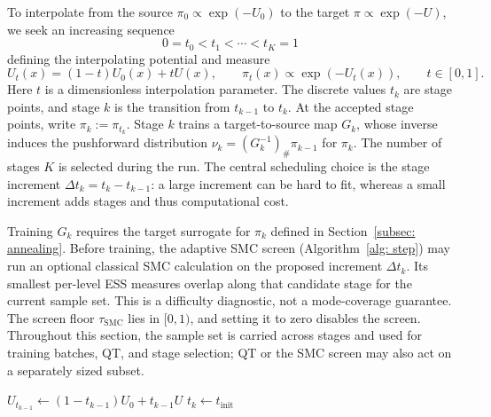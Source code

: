 \documentclass{article}
\begin{document}
To interpolate from the source $\pi_0 \propto \exp(-U_0)$ to the target $\pi \propto \exp(-U)$, we seek an increasing sequence
\begin{equation*}
    0 = t_0 < t_1 < \cdots < t_K = 1
\end{equation*}
defining the interpolating potential and measure
\begin{equation*}
    U_t(x)=(1-t)U_0(x)+tU(x),
\qquad \pi_t(x)\propto\exp(-U_t(x)),
    \qquad t\in[0,1].
\end{equation*}
Here $t$ is a dimensionless interpolation parameter. The discrete values $t_k$ are stage points, and stage $k$ is the transition from $t_{k-1}$ to $t_k$. At the accepted stage points, write $\pi_k:=\pi_{t_k}$. Stage $k$ trains a target-to-source map $G_k$, whose inverse induces the pushforward distribution $\nu_k=(G_k^{-1})_{\#}\pi_{k-1}$ for $\pi_k$. The number of stages $K$ is selected during the run. The central scheduling choice is the stage increment $\Delta t_k=t_k-t_{k-1}$: a large increment can be hard to fit, whereas a small increment adds stages and thus computational cost.

Training $G_k$ requires the target surrogate for $\pi_k$ defined in Section~\ref{subsec: annealing}. Before training, the adaptive SMC screen (Algorithm~\ref{alg: step}) may run an optional classical SMC calculation on the proposed increment $\Delta t_k$. Its smallest per-level ESS measures overlap along that candidate stage for the current sample set. This is a difficulty diagnostic, not a mode-coverage guarantee. The screen floor $\tau_{\mathrm{SMC}}$ lies in $[0,1)$, and setting it to zero disables the screen. Throughout this section, the sample set is carried across stages and used for training batches, QT, and stage selection; QT or the SMC screen may also act on a separately sized subset.

\begin{algorithm}[htb]
\caption{Adaptive SMC screen: selection of stage increment $\Delta t_k$}
\label{alg: step}

$U_{t_{k-1}} \gets (1-t_{k-1}) U_0 + t_{k-1} U$\;
$t_k \gets t_{\mathrm{init}}$\;
\end{algorithm}
\end{document}
